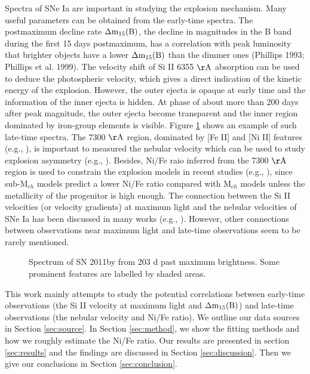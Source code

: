 \documentclass[twocolumn]{aastex631}
\begin{document}
Spectra of SNe Ia are important in studying the explosion mechanism. Many useful parameters can be obtained from the early-time spectra. The postmaximum decline rate $\rm {\Delta}m_{15}(B)$, the decline in magnitudes in the B band during the first 15 days postmaximum, has a correlation with peak luminosity that brighter objects have a lower $\rm {\Delta}m_{15}(B)$ than the dimmer ones (Phillips 1993; Phillips et al. 1999). The velocity shift of Si II 6355 $\rm \AA$ absorption can be used to deduce the photospheric velocity, which gives a direct indication of the kinetic energy of the explosion. However, the outer ejecta is opaque at early time and the information of the inner ejecta is hidden. At phase of about more than 200 days after peak magnitude, the outer ejecta become transparent and the inner region dominated by iron-group elements is visible. Figure \ref{fig:spectrum} shows an example of such late-time spectra. The 7300 $\rm \AA$ region, dominated by [Fe II] and [Ni II] features (e.g., \citealt{2018MNRAS.477.3567M,2020MNRAS.491.2902F}), is important to measured the nebular velocity which can be used to study explosion asymmetry (e.g., \citealt{2010ApJ...708.1703M,2013MNRAS.430.1030S,2018MNRAS.477.3567M}). Besides, Ni/Fe raio inferred from the 7300 $\rm \AA$ region is used to constrain the explosion models in recent studies (e.g., \citealt{2018MNRAS.477.3567M,2020MNRAS.491.2902F,2022arXiv220107864G}), since sub-M$_{ch}$ models predict a lower Ni/Fe ratio compared with M$_{ch}$ models unless the metallicity of the progenitor is high enough. The connection between the Si II velocities (or velocity gradients) at maximum light and the nebular velocities of SNe Ia has been discussed in many works (e.g., \citealt{2010ApJ...708.1703M}). However, other connections between observations near maximum light and late-time observations seem to be rarely mentioned. 

\begin{figure}[ht!]
\caption{Spectrum of SN 2011by from 203 d past maximum brightness. Some prominent features are labelled by shaded areas.} 
\label{fig:spectrum}{}
\end{figure}

This work mainly attempts to study the potential correlations between early-time observations (the Si II velocity at maximum light and $\rm {\Delta}m_{15}(B)$) and late-time observations (the nebular velocity and Ni/Fe ratio). We outline our data sources in Section \ref{sec:source}. In Section \ref{sec:method}, we show the fitting methods and how we roughly estimate the Ni/Fe ratio. Our results are presented in section \ref{sec:results} and the findings are discussed in Section \ref{sec:discussion}. Then we give our conclusions in Section \ref{sec:conclusion}.
\end{document}
